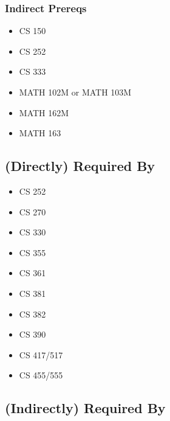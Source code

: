\documentclass[]{article}
\providecommand{\tightlist}{%
  \setlength{\itemsep}{0pt}\setlength{\parskip}{0pt}}
\begin{document}
\subsubsection{Indirect Prereqs}\label{indirect-prereqs-10}

\begin{itemize}
\tightlist
\item
  CS 150
\item
  CS 252
\item
  CS 333
\item
  MATH 102M or MATH 103M
\item
  MATH 162M
\item
  MATH 163
\end{itemize}

\subsection{(Directly) Required By}\label{directly-required-by-8}

\begin{itemize}
\tightlist
\item
  CS 252
\item
  CS 270
\item
  CS 330
\item
  CS 355
\item
  CS 361
\item
  CS 381
\item
  CS 382
\item
  CS 390
\item
  CS 417/517
\item
  CS 455/555
\end{itemize}

\subsection{(Indirectly) Required By}\label{indirectly-required-by-8}
\end{document}

